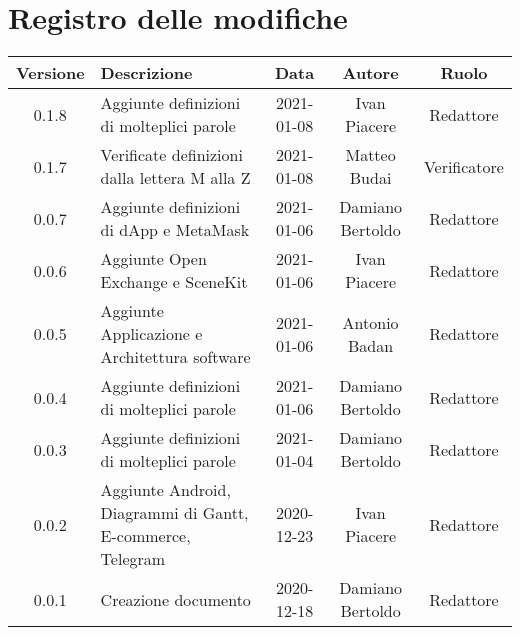 \section*{Registro delle modifiche}

\begin{center}
	\begin{longtable}{|c|p{5cm}|c|c|c|}
	\hline
	\rowcolor{lighter-grayer}
	\textbf{Versione} & \textbf{Descrizione} & \textbf{Data} & \textbf{Autore} & \textbf{Ruolo} \\
	\hline
	\endfirsthead

	0.1.8 & Aggiunte definizioni di molteplici parole & 2021-01-08 & Ivan Piacere & Redattore \\
	\hline
	0.1.7 & Verificate definizioni dalla lettera M alla Z & 2021-01-08 & Matteo Budai & Verificatore \\
	\hline
	0.0.7 & Aggiunte definizioni di dApp e MetaMask & 2021-01-06 & Damiano Bertoldo & Redattore \\
	\hline
	0.0.6 & Aggiunte Open Exchange e SceneKit & 2021-01-06 & Ivan Piacere & Redattore \\
	\hline
	0.0.5 & Aggiunte Applicazione e Architettura software & 2021-01-06 & Antonio Badan & Redattore \\
	\hline
	0.0.4 & Aggiunte definizioni di molteplici parole & 2021-01-06 & Damiano Bertoldo & Redattore \\
	\hline
	0.0.3 & Aggiunte definizioni di molteplici parole & 2021-01-04 & Damiano Bertoldo & Redattore \\
	\hline
	0.0.2 & Aggiunte Android, Diagrammi di Gantt, E-commerce, Telegram & 2020-12-23 & Ivan Piacere & Redattore \\
	\hline
	0.0.1 & Creazione documento & 2020-12-18 & Damiano Bertoldo & Redattore \\
	\hline

	\end{longtable}
\end{center}